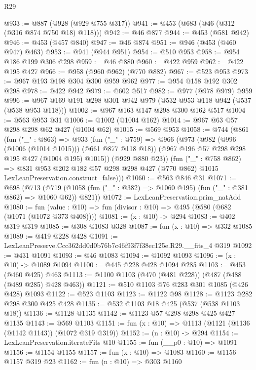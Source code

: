 \begin{lexlean}{R29}
\begin{coremodule}
@933 := @887 (@928 (@929 @755 @317))
@941 := @453 (@683 (@46 (@312 (@316 @874 @750 @18) @118)))
@942 := @46 @877
@944 := @453 (@581 @942)
@946 := @453 (@457 @840)
@947 := @46 @874
@951 := @946 (@453 (@460 @947) @463)
@953 := @941 (@944 @951)
@954 := @510 @953
@958 := @954 @186 @199 @306 @298
@959 := @46 @880
@960 := @422 @959
@962 := @422 @195 @427
@966 := @958 (@960 @962) (@770 @882)
@967 := @523 @953
@973 := @967 @193 @198 @304 @300 @959 @962
@977 := @954 @158 @192 @302 @298
@978 := @422 @942
@979 := @602 @517
@982 := @977 (@978 @979) @959
@996 := @967 @169 @191 @298 @301 @942 @979 (@532 @953 @118 @942 (@537 (@538 @953 @118)))
@1002 := @967 @163 @147 @298 @300 @162 @517
@1004 := @563 @953 @31
@1006 := @1002 (@1004 @162)
@1014 := @967 @63 @57 @298 @298 @62 @427 (@1004 @62)
@1015 := @569 @953
@1058 := @744
    (@861
      (fun ("_" : @863) =>
      @933
        (fun ("_" : @759) =>
        @966
          (@973
            (@982 (@996 (@1006 (@1014 @1015))) (@661 @877 @118 @18))
            (@967 @196 @57 @298 @298 @195 @427 (@1004 @195) @1015))
          (@929 @880 @23))
        (fun ("_" : @758 @862) =>
        @831
          @953
          @202
          @182
          @57
          @298
          @298
          @427
          (@770 @862)
          @1015
          LexLeanPreservation.construct_false)))
@1060 := @563 @846 @31
@1071 := @698
    (@713 (@719 (@1058 (fun ("_" : @382) => @1060 @195) (fun ("_" : @381 @862) => @1060 @62)) @821))
@1072 := LexLeanPreservation.prim_natAdd
@1080 := fun (value : @10) => fun (divisor : @10) => @495 (@580 (@682 (@1071 (@1072 @373 @408))))
@1081 := (x : @10) -> @294
@1083 := @402 @319 @319
@1085 := @308 @1083 @328
@1087 := fun (x : @10) => @332 @1085
@1089 := @419 @228 @428
@1091 := LexLeanPreserve.Ccc362dd0d0b76b7c46f93f7f38ec125e.R29.__fits_4 @319
@1092 := @431 @1091
@1093 := @46 @1083
@1094 := @1092 @1093
@1096 := (x : @10) -> @1089 @1094
@1100 := @445 @228 @428 @1094 @285
@1103 := @453 (@460 @425) @463
@1113 := @1100 @1103 (@470 (@481 @228)) (@487 (@488 (@489 @285) @428 @463))
@1121 := @510 @1103 @76 @283 @301 @1085 (@426 @428) @1093
@1122 := @523 @1103
@1123 := @1122 @98
@1128 := @1123 @282 @298 @300 @425 @428
@1135 := @532 @1103 @18 @425 (@537 (@538 @1103 @18))
@1136 := @1128 @1135
@1142 := @1123 @57 @298 @298 @425 @427 @1135
@1143 := @569 @1103
@1151 := fun (x : @10) => @1113 (@1121 (@1136 (@1142 @1143)) (@1072 @319 @319))
@1152 := (n : @10) -> @294
@1154 := LexLeanPreservation.iterateFits @10
@1155 := fun (__p0 : @10) => @1091
@1156 := @1154 @1155
@1157 := fun (x : @10) => @1083
@1160 := @1156 @1157 @319 @23
@1162 := fun (n : @10) => @303 @1160

\end{coremodule}
\end{lexlean}
